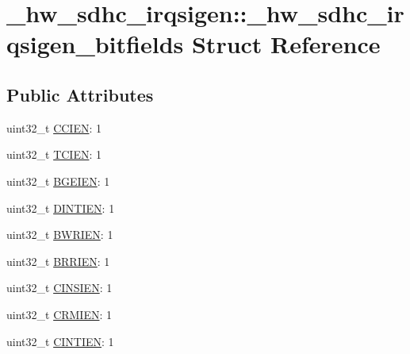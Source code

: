 \hypertarget{struct__hw__sdhc__irqsigen_1_1__hw__sdhc__irqsigen__bitfields}{}\section{\+\_\+hw\+\_\+sdhc\+\_\+irqsigen\+:\+:\+\_\+hw\+\_\+sdhc\+\_\+irqsigen\+\_\+bitfields Struct Reference}
\label{struct__hw__sdhc__irqsigen_1_1__hw__sdhc__irqsigen__bitfields}
\subsection*{Public Attributes}
\begin{DoxyCompactItemize}
\item 
uint32\+\_\+t \hyperlink{struct__hw__sdhc__irqsigen_1_1__hw__sdhc__irqsigen__bitfields_a90e5f7aa3fc61be4f1d7884e8dd90591}{C\+C\+I\+EN}\+: 1
\item 
uint32\+\_\+t \hyperlink{struct__hw__sdhc__irqsigen_1_1__hw__sdhc__irqsigen__bitfields_a81dc90db86a7de9e6db7fa446215102e}{T\+C\+I\+EN}\+: 1
\item 
uint32\+\_\+t \hyperlink{struct__hw__sdhc__irqsigen_1_1__hw__sdhc__irqsigen__bitfields_a4653f7098c11194e2cd63a162b3d2d42}{B\+G\+E\+I\+EN}\+: 1
\item 
uint32\+\_\+t \hyperlink{struct__hw__sdhc__irqsigen_1_1__hw__sdhc__irqsigen__bitfields_ab6074d9db251206f3c5b4dfa8e9b4485}{D\+I\+N\+T\+I\+EN}\+: 1
\item 
uint32\+\_\+t \hyperlink{struct__hw__sdhc__irqsigen_1_1__hw__sdhc__irqsigen__bitfields_aff84c4235184b35570ef05f7785a3d8e}{B\+W\+R\+I\+EN}\+: 1
\item 
uint32\+\_\+t \hyperlink{struct__hw__sdhc__irqsigen_1_1__hw__sdhc__irqsigen__bitfields_ad7971acb19743a3e663b4fac81958bc8}{B\+R\+R\+I\+EN}\+: 1
\item 
uint32\+\_\+t \hyperlink{struct__hw__sdhc__irqsigen_1_1__hw__sdhc__irqsigen__bitfields_ad2a8e52c3856762d7e5beed3b69f1312}{C\+I\+N\+S\+I\+EN}\+: 1
\item 
uint32\+\_\+t \hyperlink{struct__hw__sdhc__irqsigen_1_1__hw__sdhc__irqsigen__bitfields_a64b02cb40495ee6bafbf83a69f12266f}{C\+R\+M\+I\+EN}\+: 1
\item 
uint32\+\_\+t \hyperlink{struct__hw__sdhc__irqsigen_1_1__hw__sdhc__irqsigen__bitfields_af1dec2c1faafb89bca8d02f9522cd3a7}{C\+I\+N\+T\+I\+EN}\+: 1
\item 

\end{DoxyCompactItemize}
